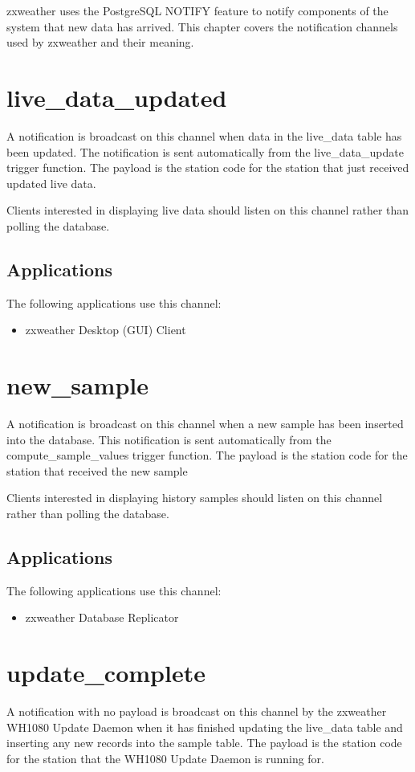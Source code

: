 \documentclass[a4paper,10pt]{book}
\begin{document}
zxweather uses the PostgreSQL NOTIFY feature to notify components of the system that new data has arrived. This chapter covers the notification channels used by zxweather and their meaning.

\section{live\_data\_updated}
A notification is broadcast on this channel when data in the live\_data table has been updated. The notification is sent automatically from the live\_data\_update trigger function. The payload is the station code for the station that just received updated live data.

Clients interested in displaying live data should listen on this channel rather than polling the database.

\subsection{Applications}
The following applications use this channel:

\begin{itemize}
\item zxweather Desktop (GUI) Client
\end{itemize}

\section{new\_sample}
A notification is broadcast on this channel when a new sample has been inserted into the database. This notification is sent automatically from the compute\_sample\_values trigger function. The payload is the station code for the station that received the new sample

Clients interested in displaying history samples should listen on this channel rather than polling the database.

\subsection{Applications}
The following applications use this channel:

\begin{itemize}
\item zxweather Database Replicator
\end{itemize}

\section{update\_complete}
A notification with no payload is broadcast on this channel by the zxweather WH1080 Update Daemon when it has finished updating the live\_data table and inserting any new records into the sample table. The payload is the station code for the station that the WH1080 Update Daemon is running for.
\end{document}
